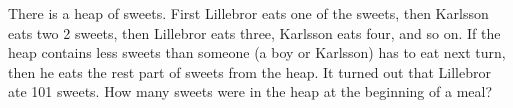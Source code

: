 \problem
There is a heap of sweets.
First Lillebror eats one of the sweets, then Karlsson eats two 2 sweets, then
Lillebror eats three, Karlsson eats four, and so on.
If the heap contains less sweets than someone (a boy or Karlsson) has to eat
next turn, then he eats the rest part of sweets from the heap.
It turned out that Lillebror ate 101 sweets.
How many sweets were in the heap at the beginning of a meal?
\solution
\endproblem
